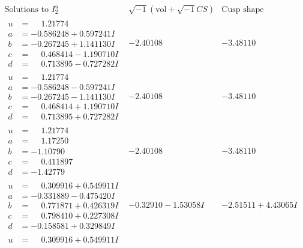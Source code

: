 \documentclass[1p]{elsarticle_modified}
\theoremstyle{definition}
\newcommand{\I}{\sqrt{-1}}
\begin{document}
$$\begin{array}{c|c|c}  
\text{Solutions to }I^u_{2}& \I (\text{vol} + \sqrt{-1}CS) & \text{Cusp shape}\\
 \hline 
\begin{aligned}
u &= \phantom{-}1.21774\phantom{ +0.000000I} \\
a &= -0.586248 + 0.597241 I \\
b &= -0.267245 + 1.141130 I \\
c &= \phantom{-}0.468414 - 1.190710 I \\
d &= \phantom{-}0.713895 - 0.727282 I\end{aligned}
 & -2.40108\phantom{ +0.000000I} & -3.48110\phantom{ +0.000000I} \\ \hline\begin{aligned}
u &= \phantom{-}1.21774\phantom{ +0.000000I} \\
a &= -0.586248 - 0.597241 I \\
b &= -0.267245 - 1.141130 I \\
c &= \phantom{-}0.468414 + 1.190710 I \\
d &= \phantom{-}0.713895 + 0.727282 I\end{aligned}
 & -2.40108\phantom{ +0.000000I} & -3.48110\phantom{ +0.000000I} \\ \hline\begin{aligned}
u &= \phantom{-}1.21774\phantom{ +0.000000I} \\
a &= \phantom{-}1.17250\phantom{ +0.000000I} \\
b &= -1.10790\phantom{ +0.000000I} \\
c &= \phantom{-}0.411897\phantom{ +0.000000I} \\
d &= -1.42779\phantom{ +0.000000I}\end{aligned}
 & -2.40108\phantom{ +0.000000I} & -3.48110\phantom{ +0.000000I} \\ \hline\begin{aligned}
u &= \phantom{-}0.309916 + 0.549911 I \\
a &= -0.331889 - 0.475420 I \\
b &= \phantom{-}0.771871 + 0.426319 I \\
c &= \phantom{-}0.798410 + 0.227308 I \\
d &= -0.158581 + 0.329849 I\end{aligned}
 & -0.32910 - 1.53058 I & -2.51511 + 4.43065 I \\ \hline\begin{aligned}
u &= \phantom{-}0.309916 + 0.549911 I \\

\end{aligned}
\end{array}$$
\end{document}
